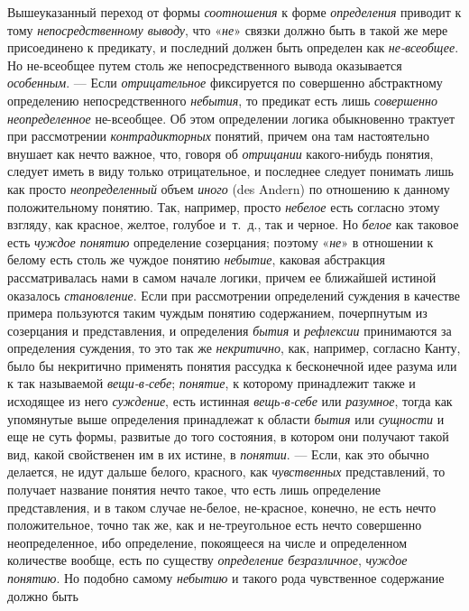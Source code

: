 \documentclass[twoside]{article}
\begin{document}
{{{Вышеуказанный переход от формы
{\em соотношения} к форме
{\em определения}
приводит к тому
{\em непосредственному выводу},
что «{\em не}»
связки должно быть в такой же мере присоединено к предикату,
и последний должен быть определен как
{\em не-всеобщее}. Но
не-всеобщее путем столь же непосредственного вывода оказывается
{\em особенным}. — Если
{\em отрицательное}
фиксируется по совершенно абстрактному определению
непосредственного {\em небытия},
то предикат есть лишь
{\em совершенно неопределенное}
не-всеобщее. Об этом определении логика обыкновенно трактует
при рассмотрении {\em контрадикторных}
понятий, причем она там настоятельно внушает как нечто
важное, что, говоря об {\em отрицании}
какого-нибудь понятия, следует иметь в виду только
отрицательное, и последнее следует понимать лишь как просто
{\em неопределенный}
объем {\em иного} (des
Andern) по отношению к данному положительному понятию. Так,
например, просто {\em небелое}
есть согласно этому взгляду, как красное, желтое, голубое
и~т.~д., так и черное. Но {\em белое}
как таковое есть
{\em чуждое понятию}
определение созерцания; поэтому
«{\em не}» в отношении к
белому есть столь же чуждое понятию
{\em небытие}, каковая
абстракция рассматривалась нами в самом начале логики, причем ее ближайшей
истиной оказалось {\em становление}.
Если при рассмотрении определений суждения в
качестве примера пользуются таким чуждым понятию
содержанием, почерпнутым из созерцания и представления, и определения
{\em бытия} и
{\em рефлексии}
принимаются за определения суждения, то это так же
{\em некритично}, как,
например, согласно Канту, было бы некритично применять понятия рассудка к
бесконечной идее разума или к так называемой
{\em вещи-в-себе};
{\em понятие}, к которому
принадлежит также и исходящее из него
{\em суждение}, есть
истинная {\em вещь-в-себе}
или {\em разумное},
тогда как упомянутые выше определения принадлежат к области
{\em бытия} или
{\em сущности} и еще не
суть формы, развитые до того состояния, в котором они получают такой вид,
какой свойственен им в их истине, в
{\em понятии}. — Если,
как это обычно делается, не идут дальше белого, красного, как
{\em чувственных}
представлений, то получает название понятия нечто такое, что
есть лишь определение представления, и в таком случае не-белое, не-красное,
конечно, не есть нечто положительное, точно так же, как и не-треугольное
есть нечто совершенно неопределенное, ибо определение, покоящееся на числе
и определенном количестве вообще, есть по существу
{\em определение безразличное},
{\em чуждое понятию}. Но
подобно самому {\em небытию}
и такого рода чувственное содержание должно быть
}}}
\end{document}
